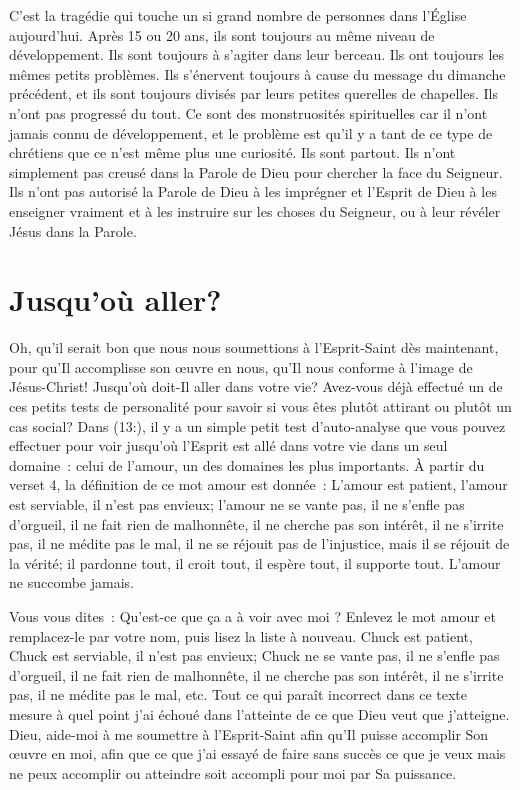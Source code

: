 C'est la tragédie qui touche un si grand nombre de personnes
 dans l'Église aujourd'hui. Après 15 ou 20 ans,
 ils sont toujours au même niveau de développement.
 Ils sont toujours à s'agiter dans leur berceau.
 Ils ont toujours les mêmes petits problèmes.
 Ils s'énervent toujours à cause du message du dimanche précédent,
 et ils sont toujours divisés par leurs petites querelles de chapelles.
 Ils n'ont pas progressé du tout. Ce sont des monstruosités spirituelles
 car il n'ont jamais connu de développement, et le problème est qu'il y a
 tant de ce type de chrétiens que ce n'est même plus une curiosité.
 Ils sont partout. Ils n'ont simplement pas creusé dans la Parole de Dieu
 pour chercher la face du Seigneur. Ils n'ont pas autorisé la Parole de Dieu
 à les imprégner et l'Esprit de Dieu à les enseigner vraiment et
 à les instruire sur les choses du Seigneur,
 ou à leur révéler Jésus dans la Parole.


\section*{Jusqu'où aller?}

Oh, qu'il serait bon que nous nous soumettions à l'Esprit-Saint
 dès maintenant, pour qu'Il accomplisse son œuvre en nous,
 qu'Il nous conforme à l'image de Jésus-Christ!
 Jusqu'où doit-Il aller dans votre vie?
 Avez-vous déjà effectué un de ces petits tests de personalité pour savoir
 si vous êtes plutôt attirant ou plutôt un cas social?
 Dans (13:), il y a un simple petit test d'auto-analyse
 que vous pouvez effectuer pour voir jusqu'où l'Esprit est allé
 dans votre vie dans un seul domaine~: celui de l'amour,
 un des domaines les plus importants.
 À partir du verset 4, la définition de ce mot \og amour \fg{} est donnée~:
 \og L'amour est patient, l'amour est serviable, il n'est pas envieux;
 l'amour ne se vante pas, il ne s'enfle pas d'orgueil,
 il ne fait rien de malhonnête, il ne cherche pas son intérêt,
 il ne s'irrite pas, il ne médite pas le mal, il ne se réjouit pas
 de l'injustice, mais il se réjouit de la vérité; il pardonne tout,
 il croit tout, il espère tout, il supporte tout.
 L'amour ne succombe jamais. \fg{}

Vous vous dites~:
 \og Qu'est-ce que ça a à voir avec moi ? \fg{}
 Enlevez le mot \og amour \fg{} et remplacez-le par votre nom,
 puis lisez la liste à nouveau.
 \og Chuck est patient, Chuck est serviable, il n'est pas envieux;
 Chuck ne se vante pas, il ne s'enfle pas d'orgueil, il ne fait rien
 de malhonnête, il ne cherche pas son intérêt, il ne s'irrite pas,
 il ne médite pas le mal, etc. \fg{}
 Tout ce qui paraît incorrect dans ce texte mesure à quel point j'ai échoué
 dans l'atteinte de ce que Dieu veut que j'atteigne.
 Dieu, aide-moi à me soumettre à l'Esprit-Saint afin qu'Il puisse accomplir
 Son œuvre en moi, afin que ce que j'ai essayé de faire sans succès
 \ocadr ce que je veux mais ne peux accomplir ou atteindre \fcadr
 soit accompli pour moi par Sa puissance.

